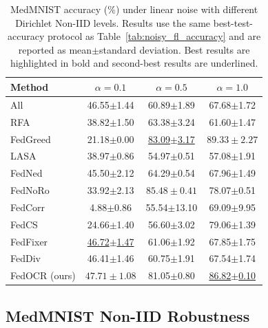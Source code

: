 \begin{table}[h]
	\centering
	\caption{\normalfont MedMNIST accuracy (\%) under linear noise with different Dirichlet Non-IID levels. Results use the same best-test-accuracy protocol as Table~\ref{tab:noisy_fl_accuracy} and are reported as mean$\pm$standard deviation. Best results are highlighted in bold and second-best results are underlined.}
	\label{tab:medmnist_noniid_appendix}
	\setlength{\tabcolsep}{5pt}
	\renewcommand{\arraystretch}{1.10}
	\begin{tabular}{lccc}
		\toprule
		\textbf{Method} & $\alpha=0.1$ & $\alpha=0.5$ & $\alpha=1.0$ \\
		\midrule
		All & 46.55$\pm$1.44 & 60.89$\pm$1.89 & 67.68$\pm$1.72 \\
		RFA~\cite{pillutla2022robust} & 38.82$\pm$1.50 & 63.38$\pm$3.24 & 61.60$\pm$1.47 \\
		FedGreed~\cite{kritharakis2025fedgreed} & 21.18$\pm$0.00 & \underline{83.09$\pm$3.17} & $\boldsymbol{89.33\pm2.27}$ \\
		LASA~\cite{xu2025lasa} & 38.97$\pm$0.86 & 54.97$\pm$0.51 & 57.08$\pm$1.91 \\
		FedNed~\cite{lu2024fedned} & 45.50$\pm$2.12 & 64.29$\pm$0.54 & 67.96$\pm$1.49 \\
		FedNoRo~\cite{wu2023fednoro} & 33.92$\pm$2.13 & $\boldsymbol{85.48\pm0.41}$ & 78.07$\pm$0.51 \\
		FedCorr~\cite{xu2022fedcorr} & 4.88$\pm$0.86 & 55.54$\pm$13.10 & 69.09$\pm$9.95 \\
		FedCS~\cite{hao2025fedcs} & 24.66$\pm$1.40 & 56.60$\pm$3.02 & 79.06$\pm$1.39 \\
		FedFixer~\cite{ji2024fedfixer} & \underline{46.72$\pm$1.47} & 61.06$\pm$1.92 & 67.85$\pm$1.75 \\
		FedDiv~\cite{li2024feddiv} & 46.41$\pm$1.46 & 60.75$\pm$1.91 & 67.54$\pm$1.74 \\
		\midrule
		FedOCR (ours) & $\boldsymbol{47.71\pm1.08}$ & 81.05$\pm$0.80 & \underline{86.82$\pm$0.10} \\
		\bottomrule
	\end{tabular}
\end{table}

\subsection{MedMNIST Non-IID Robustness}

